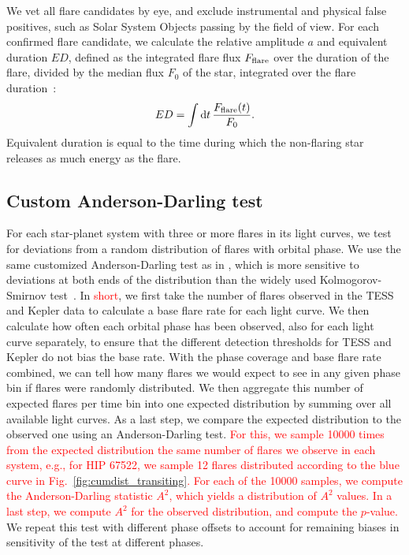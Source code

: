 \documentclass[twocolumn]{aastex631}
\begin{document}
We vet all flare candidates by eye, and exclude instrumental and physical false positives, such as Solar System Objects passing by the field of view. For each confirmed flare candidate, we calculate the relative amplitude $a$ and equivalent duration $ED$, defined as the integrated flare flux $F_{\rm flare}$ over the duration of the flare, divided by the median flux $F_0$ of the star, integrated over the flare duration~\citep{gershberg1972results}:
\begin{equation}
\label{eq:ED}
ED=\displaystyle \int \mathrm dt\, \frac{F_{\rm flare}(t)}{F_0}.
\end{equation}
Equivalent duration is equal to the time during which the non-flaring star releases as much energy as the flare.


\subsection{Custom Anderson-Darling test}
\label{sec:methods:adtest}
For each star-planet system with three or more flares in its light curves, we test for deviations from a random distribution of flares with orbital phase. We use the same customized Anderson-Darling test as in \cite{ilin2022searching}, which is more sensitive to deviations at both ends of the distribution than the widely used Kolmogorov-Smirnov test~\citep{feigelson2012modern}. In \textcolor{red}{short}, we first take the number of flares observed in the TESS and Kepler data to calculate a base flare rate for each light curve. We then calculate how often each orbital phase has been observed, also for each light curve separately, to ensure that the different detection thresholds for TESS and Kepler do not bias the base rate. With the phase coverage and base flare rate combined, we can tell how many flares we would expect to see in any given phase bin if flares were randomly distributed. We then aggregate this number of expected flares per time bin into one expected distribution by summing over all available light curves. As a last step, we compare the expected distribution to the observed one using an Anderson-Darling test. \textcolor{red}{For this, we sample 10000 times from the expected distribution the same number of flares we observe in each system, e.g., for HIP 67522, we sample 12 flares distributed according to the blue curve in Fig.~\ref{fig:cumdist_transiting}. For each of the 10000 samples, we compute the Anderson-Darling statistic $A^2$, which yields a distribution of $A^2$ values. In a last step, we compute $A^2$ for the observed distribution, and compute the $p$-value.} We repeat this test with different phase offsets to account for remaining biases in sensitivity of the test at different phases.
\end{document}
